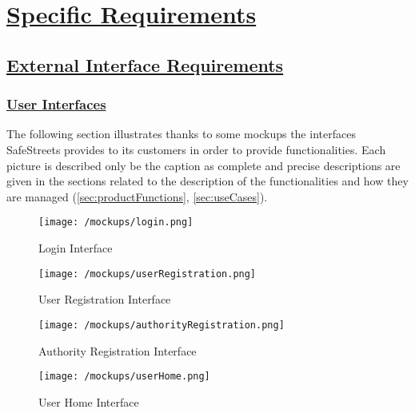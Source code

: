 \section[Specific Requirements]{\hyperlink{toc}{Specific Requirements}}

\subsection[External Interface Requirements]{\hyperlink{toc}{External Interface Requirements}}
	\label{sec:externalInterfaceRequirements}
	\subsubsection[User Interfaces]{\hyperlink{toc}{User Interfaces}} %
	\label{sec:userInterfaces}
	The following section illustrates thanks to some mockups the interfaces SafeStreets provides to its customers in order to provide functionalities. Each picture is described only be the caption as complete and precise descriptions are given in the sections related to the description of the functionalities and how they are managed (\ref{sec:productFunctions}, \ref{sec:useCases}).
	
	\begin{figure}[h]
		\centering
		\begin{minipage}{0.45\textwidth}
			\centering
			\texttt{[image: /mockups/login.png]}
			\caption{Login Interface}
		\end{minipage}\hfill
		\begin{minipage}{0.45\textwidth}
			\centering
			\texttt{[image: /mockups/userRegistration.png]}
			\caption{User Registration Interface}
		\end{minipage}
	\end{figure}

	\begin{figure}[h]
		\centering
		\begin{minipage}{0.45\textwidth}
			\centering
			\texttt{[image: /mockups/authorityRegistration.png]}
			\caption{Authority Registration Interface}
		\end{minipage}\hfill
		\begin{minipage}{0.45\textwidth}
			\centering
			\texttt{[image: /mockups/userHome.png]}
			\caption{User Home Interface}
		\end{minipage}
	\end{figure}

